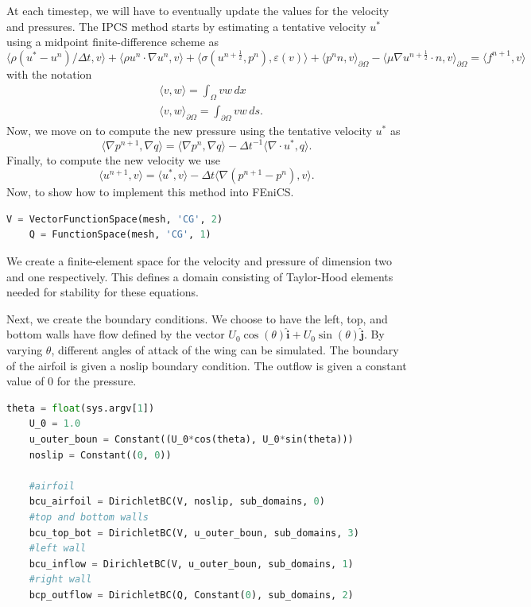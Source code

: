 \documentclass[12pt]{article}
\theoremstyle{definition}
\numberwithin{equation}{section}
\newcommand{\uvec}[1]{\boldsymbol{\hat{\textbf{#1}}}}
\renewcommand{\epsilon}{\varepsilon}
\begin{document}
	At each timestep, we will have to eventually update the values for the velocity and pressures. The IPCS method starts by estimating a tentative velocity $u^*$ using a midpoint finite-difference scheme as
	\begin{equation}\label{eq:tenvel}
	\langle\rho(u^*-u^n)/\Delta t,v\rangle+\langle\rho u^n\cdot\nabla u^n,v\rangle+\langle \sigma(u^{n+\frac{1}{2}},p^n),\epsilon(v)\rangle+\langle 	p^nn,v\rangle_{\partial\Omega}-\langle \mu\nabla u^{n+\frac{1}{2}}\cdot n,v\rangle_{\partial\Omega}=\langle f^{n+1},v\rangle
	\end{equation}
	with the notation
	\begin{align*}
	&\langle v,w\rangle=\int_\Omega vw\,dx\\
	&\langle v,w\rangle_{\partial\Omega} = \int_{\partial\Omega}vw\,ds.
	\end{align*}
	Now, we move on to compute the new pressure using the tentative velocity $u^*$ as
	\begin{equation}\label{eq:newpress}
	\langle\nabla p^{n+1},\nabla q\rangle=\langle\nabla p^n,\nabla q\rangle-\Delta t^{-1}\langle\nabla\cdot u^*,q\rangle.
	\end{equation}
	Finally, to compute the new velocity we use
	\begin{equation}\label{eq:newvel}
	\langle u^{n+1},v\rangle=\langle u^*,v\rangle-\Delta t\langle\nabla(p^{n+1}−p^n),v\rangle.
	\end{equation}
	Now, to show how to implement this method into FEniCS. 
	\begin{lstlisting}[language=Python]
	V = VectorFunctionSpace(mesh, 'CG', 2)
	Q = FunctionSpace(mesh, 'CG', 1)
	\end{lstlisting}
	We create a finite-element space for the velocity and pressure of dimension two and one respectively. This defines a domain consisting of Taylor-Hood elements needed for stability for these equations. 
	
	Next, we create the boundary conditions. We choose to have the left, top, and bottom walls have flow defined by the vector $U_0\cos(\theta)\uvec{i} + U_0\sin(\theta)\uvec{j}$. By varying $\theta$, different angles of attack of the wing can be simulated. The boundary of the airfoil is given a noslip boundary condition. The outflow is given a constant value of 0 for the pressure.
	
	\begin{lstlisting}[language=Python]
	theta = float(sys.argv[1])
	U_0 = 1.0
	u_outer_boun = Constant((U_0*cos(theta), U_0*sin(theta)))
	noslip = Constant((0, 0))
	
	#airfoil
	bcu_airfoil = DirichletBC(V, noslip, sub_domains, 0) 
	#top and bottom walls
	bcu_top_bot = DirichletBC(V, u_outer_boun, sub_domains, 3)
	#left wall
	bcu_inflow = DirichletBC(V, u_outer_boun, sub_domains, 1)
	#right wall 
	bcp_outflow = DirichletBC(Q, Constant(0), sub_domains, 2) 
	\end{lstlisting}
	
\end{document}
